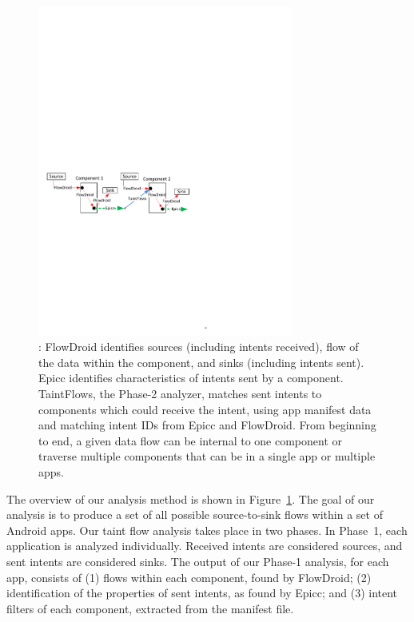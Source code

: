 \begin{figure}[b!]
\center
\includegraphics[trim = 5mm 100mm 85mm 140mm, clip, width=0.75\textwidth]{analysisPerDataFlowType_2comps.pdf}
\caption[Analysis by data flow type]{: FlowDroid identifies sources (including intents received), flow of the data within the component, and sinks (including intents sent). Epicc identifies characteristics of intents sent by a component. TaintFlows, the Phase-2 analyzer, matches sent intents to components which could receive the intent, using app manifest data and matching intent IDs from Epicc and FlowDroid. 
From beginning to end, a given data flow can be internal to one component or traverse multiple components that can be in a single app or multiple apps.}
\label{fig:analysisPerDataflowType}
\end{figure}

The overview of our analysis method is shown in Figure~\ref{fig:analysisPerDataflowType}.
%
The goal of our analysis is to produce a set of all possible source-to-sink
flows within a set of Android apps.  
%
Our taint flow analysis takes place in two phases.  In
Phase~1, each application is analyzed individually.  Received intents
are considered sources, and sent intents are considered sinks.
The output of our Phase-1 analysis, for each app, consists of 
(1) flows within each component, found by FlowDroid;
(2) identification of the properties of sent intents, as found by Epicc; and
(3) intent filters of each component, extracted from the manifest file.

